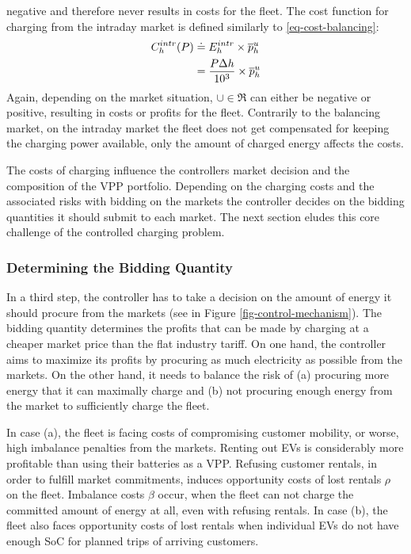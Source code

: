 \documentclass[a4paper, 12pt]{article}
\begin{document}
negative and therefore never results in costs for the fleet. The cost function
for charging from the intraday market is defined similarly to
\eqref{eq-cost-balancing}:
\begin{equation}
\begin{split}
    C^{intr}_{h}(P) &\doteq E^{intr}_{h} \times \overline p^u_{h} \\
    &= \frac{P\Delta h}{10^{3}}\times \overline p^u_{h}
\end{split}
\end{equation}
Again, depending on the market situation, \(\cup{}\!\in\!\Re\) can either be
negative or positive, resulting in costs or profits for the fleet. Contrarily to
the balancing market, on the intraday market the fleet does not get compensated
for keeping the charging power available, only the amount of charged energy affects the
costs.

The costs of charging influence the controllers market decision and the
composition of the VPP portfolio. Depending on the charging costs and the
associated risks with bidding on the markets the controller decides on the
bidding quantities it should submit to each market. The next section eludes this
core challenge of the controlled charging problem.

\subsubsection{Determining the Bidding Quantity}
\label{sec:org6107249}
In a third step, the controller has to take a decision on the amount of energy
it should procure from the markets (see in Figure
\ref{fig-control-mechanism}). The bidding quantity determines the profits that can
be made by charging at a cheaper market price than the flat industry tariff. On
one hand, the controller aims to maximize its profits by procuring as much
electricity as possible from the markets. On the other hand, it needs to balance
the risk of (a) procuring more energy that it can maximally charge and (b) not
procuring enough energy from the market to sufficiently charge the fleet.

In case (a), the fleet is facing costs of compromising customer mobility, or
worse, high imbalance penalties from the markets. Renting out EVs is
considerably more profitable than using their batteries as a VPP. Refusing
customer rentals, in order to fulfill market commitments, induces opportunity
costs of lost rentals \(\rho\) on the fleet. Imbalance costs \(\beta\) occur, when
the fleet can not charge the committed amount of energy at all, even with refusing
rentals. In case (b), the fleet also faces opportunity costs of lost rentals
when individual EVs do not have enough SoC for planned trips of arriving
customers.
\end{document}
